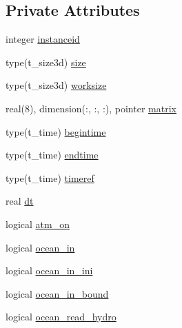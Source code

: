 \subsection*{Private Attributes}
\begin{DoxyCompactItemize}
\item 
integer \mbox{\hyperlink{structmoduledelft3d__2__mohid_1_1t__delft3d__2__mohid_a5a8043c0d36f60f2f5346f00834af26f}{instanceid}}
\item 
type(t\+\_\+size3d) \mbox{\hyperlink{structmoduledelft3d__2__mohid_1_1t__delft3d__2__mohid_a72253e14195d992be474eb5a175e702a}{size}}
\item 
type(t\+\_\+size3d) \mbox{\hyperlink{structmoduledelft3d__2__mohid_1_1t__delft3d__2__mohid_a2dc26a72cd9cc01738a0acff65b84235}{worksize}}
\item 
real(8), dimension(\+:, \+:, \+:), pointer \mbox{\hyperlink{structmoduledelft3d__2__mohid_1_1t__delft3d__2__mohid_a9998d65f4e0c5a1afffdf00864f2e1b1}{matrix}}
\item 
type(t\+\_\+time) \mbox{\hyperlink{structmoduledelft3d__2__mohid_1_1t__delft3d__2__mohid_a49c4b20496b56071d8bf8da6af91b0bc}{begintime}}
\item 
type(t\+\_\+time) \mbox{\hyperlink{structmoduledelft3d__2__mohid_1_1t__delft3d__2__mohid_a62288cfb7972f0b8ad5aeed183228185}{endtime}}
\item 
type(t\+\_\+time) \mbox{\hyperlink{structmoduledelft3d__2__mohid_1_1t__delft3d__2__mohid_a349c1d3a1b7e18ccca80db3243d2097e}{timeref}}
\item 
real \mbox{\hyperlink{structmoduledelft3d__2__mohid_1_1t__delft3d__2__mohid_ac7da05189337e913ead8ed6571f27e35}{dt}}
\item 
logical \mbox{\hyperlink{structmoduledelft3d__2__mohid_1_1t__delft3d__2__mohid_acb8c1e88079adfab1cedeaaf32f3b5a9}{atm\+\_\+on}}
\item 
logical \mbox{\hyperlink{structmoduledelft3d__2__mohid_1_1t__delft3d__2__mohid_add2d8fdedca23e4cb4234a430f872875}{ocean\+\_\+in}}
\item 
logical \mbox{\hyperlink{structmoduledelft3d__2__mohid_1_1t__delft3d__2__mohid_a80d3e3454867f12bc9567ac61e42e3dc}{ocean\+\_\+in\+\_\+ini}}
\item 
logical \mbox{\hyperlink{structmoduledelft3d__2__mohid_1_1t__delft3d__2__mohid_abb8b981e08a40f910b19bbbe1048b868}{ocean\+\_\+in\+\_\+bound}}
\item 
logical \mbox{\hyperlink{structmoduledelft3d__2__mohid_1_1t__delft3d__2__mohid_a59993f9a1c1309c725e8f4312d966ced}{ocean\+\_\+read\+\_\+hydro}}

\end{DoxyCompactItemize}

